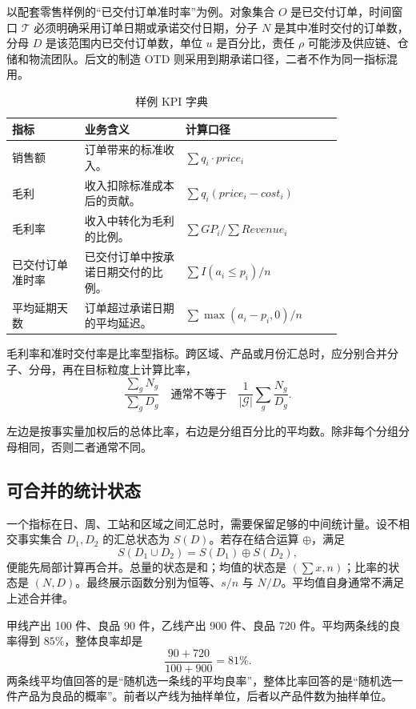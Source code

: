 以配套零售样例的“已交付订单准时率”为例。对象集合 \(O\) 是已交付订单，时间窗口 \(\mathcal T\) 必须明确采用订单日期或承诺交付日期，分子 \(N\) 是其中准时交付的订单数，分母 \(D\) 是该范围内已交付订单数，单位 \(u\) 是百分比，责任 \(\rho\) 可能涉及供应链、仓储和物流团队。后文的制造 OTD 则采用到期承诺口径，二者不作为同一指标混用。

\begin{table}[htbp]
\centering
\caption{样例 KPI 字典}
\begin{tabular}{P{0.18\linewidth}P{0.25\linewidth}P{0.39\linewidth}}
\toprule
{}
指标 & 业务含义 & 计算口径\\
\midrule
销售额 & 订单带来的标准收入。 & \(\sum q_i \cdot price_i\)\\
毛利 & 收入扣除标准成本后的贡献。 & \(\sum q_i(price_i-cost_i)\)\\
毛利率 & 收入中转化为毛利的比例。 & \(\sum GP_i / \sum Revenue_i\)\\
已交付订单准时率 & 已交付订单中按承诺日期交付的比例。 & \(\sum I(a_i\le p_i)/n\)\\
平均延期天数 & 订单超过承诺日期的平均延迟。 & \(\sum \max(a_i-p_i,0)/n\)\\
\bottomrule
\end{tabular}
\end{table}

毛利率和准时交付率是比率型指标。跨区域、产品或月份汇总时，应分别合并分子、分母，再在目标粒度上计算比率，
\[
\frac{\sum_{g}N_g}{\sum_{g}D_g}
\quad\text{通常不等于}\quad
\frac{1}{|\mathcal G|}\sum_g\frac{N_g}{D_g}.
\]

\begin{remark}
左边是按事实量加权后的总体比率，右边是分组百分比的平均数。除非每个分组分母相同，否则二者通常不同。
\end{remark}

\subsection{可合并的统计状态}
一个指标在日、周、工站和区域之间汇总时，需要保留足够的中间统计量。设不相交事实集合 \(D_1,D_2\) 的汇总状态为 \(S(D)\)。若存在结合运算 \(\oplus\)，满足
\[
S(D_1\cup D_2)=S(D_1)\oplus S(D_2),
\]
便能先局部计算再合并。总量的状态是和；均值的状态是 \((\sum x,n)\)；比率的状态是 \((N,D)\)。最终展示函数分别为恒等、\(s/n\) 与 \(N/D\)。平均值自身通常不满足上述合并律。

\begin{example}[良率的正确汇总]
甲线产出 100 件、良品 90 件，乙线产出 900 件、良品 720 件。平均两条线的良率得到 \(85\%\)，整体良率却是
\[
\frac{90+720}{100+900}=81\%.
\]
两条线平均值回答的是“随机选一条线的平均良率”，整体比率回答的是“随机选一件产品为良品的概率”。前者以产线为抽样单位，后者以产品件数为抽样单位。
\end{example}

